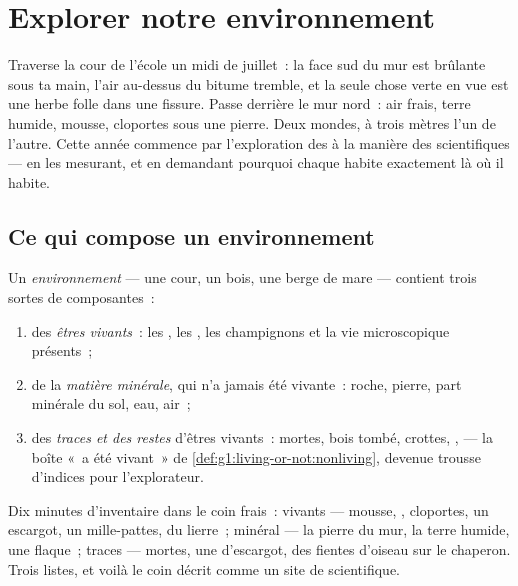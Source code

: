 \chapter{Explorer notre environnement}\label{ch:g6:exploring-our-environment}

Traverse la cour de l'école un midi de juillet~: la face sud du mur
est brûlante sous ta main, l'air au-dessus du bitume tremble, et la
seule chose verte en vue est une herbe folle dans une fissure. Passe
derrière le mur nord~: air frais, terre humide, mousse, cloportes
sous une pierre. Deux mondes, à trois mètres l'un de l'autre. Cette
année commence par l'exploration des  à la manière des
scientifiques --- en les mesurant, et en demandant pourquoi chaque
 habite exactement là où il habite.

\section{Ce qui compose un environnement}

\begin{definition}\label{def:g6:exploring-our-environment:components}
Un \emph{environnement} --- une cour, un bois,
une berge de mare --- contient trois sortes de composantes~:
\begin{enumerate}
  \item des \emph{êtres vivants}~: les ,
        les , les champignons et la vie microscopique
        présents~;
  \item de la \emph{matière minérale}, qui
        n'a jamais été vivante~: roche, pierre, part minérale du
        sol, eau, air~;
  \item des \emph{traces et des restes} d'êtres vivants~: 
        mortes, bois tombé, crottes, ,  --- la boîte
        «~a été vivant~» de
        \cref{def:g1:living-or-not:nonliving}, devenue trousse
        d'indices pour l'explorateur.
\end{enumerate}
\end{definition}

\begin{example}\label{ex:g6:exploring-our-environment:inventory}
Dix minutes d'inventaire dans le coin frais~: vivants --- mousse,
, cloportes, un escargot, un mille-pattes, du lierre~;
minéral --- la pierre du mur, la terre humide, une flaque~; traces
---  mortes, une  d'escargot, des fientes d'oiseau
sur le chaperon. Trois listes, et voilà le coin décrit comme un site
de scientifique.
\end{example}

